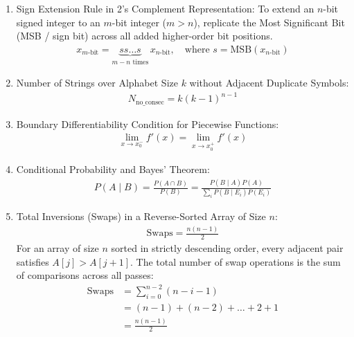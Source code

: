 \begin{enumerate}[label=\thesubsection.\arabic*, ref=\thesubsection.\theenumi]
\item Sign Extension Rule in 2's Complement Representation:
To extend an $n$-bit signed integer to an $m$-bit integer ($m > n$), replicate the Most Significant Bit (MSB / sign bit) across all added higher-order bit positions.
\begin{align}
x_{m\text{-bit}} = \underbrace{s s \dots s}_{m-n \text{ times}} \, x_{n\text{-bit}}, \quad \text{where } s = \text{MSB}(x_{n\text{-bit}}) \label{eq:CS12025-sign_extension}
\end{align}

\item Number of Strings over Alphabet Size $k$ without Adjacent Duplicate Symbols:
\begin{align}
N_{\text{no\_consec}} = k(k-1)^{n-1} \label{eq:CS12025-no_consec_strings}
\end{align}

\item Boundary Differentiability Condition for Piecewise Functions:
\begin{align}
\lim_{x \to x_0^-} f'(x) = \lim_{x \to x_0^+} f'(x) \label{eq:CS12025-piecewise_differentiability}
\end{align}

\item Conditional Probability and Bayes' Theorem:
\begin{align}
P(A \mid B) = \frac{P(A \cap B)}{P(B)} = \frac{P(B \mid A)P(A)}{\sum_i P(B \mid E_i)P(E_i)} \label{eq:CS12025-bayes_theorem}
\end{align}

\item Total Inversions (Swaps) in a Reverse-Sorted Array of Size $n$:
\begin{align}
\text{Swaps} = \frac{n(n-1)}{2} \label{eq:CS12025-bubble_sort_swaps}
\end{align}
\solution
For an array of size $n$ sorted in strictly descending order, every adjacent pair satisfies $A[j] > A[j+1]$. The total number of swap operations is the sum of comparisons across all passes:
\begin{align}
\text{Swaps} &= \sum_{i=0}^{n-2} (n - i - 1) \\
             &= (n - 1) + (n - 2) + \dots + 2 + 1 \\
             &= \frac{n(n-1)}{2}
\end{align}


\end{enumerate}
